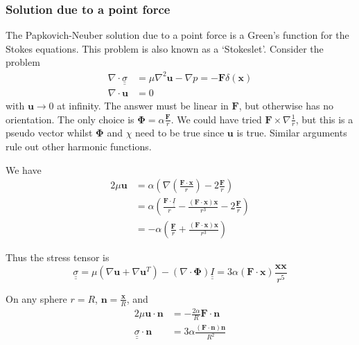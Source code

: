 \documentclass{jknotes}
\newcommand{\dunder}[1]{\underline{\underline{#1}}}
\newcommand{\x}{\bm{x}}
\newcommand{\inv}[1]{\frac{1}{#1}}
\begin{document}
\subsubsection{Solution due to a point force}
The Papkovich-Neuber solution due to a point force is a Green's function for
the Stokes equations. This problem is also known as a `Stokeslet'. Consider
the problem
\begin{equation}
	\begin{aligned}
		\nabla \cdot \dunder{\sigma} &= \mu \nabla^2 \bm{u} - \nabla p = -
		\bm{F} \delta(\x) \\
		\nabla \cdot \bm{u} &= 0
	\end{aligned}
\end{equation}
with $\bm{u} \to 0$ at infinity. The answer must be linear in $\bm{F}$, but
otherwise has no orientation. The only choice is $\bm{\Phi} = \alpha
\frac{\bm{F}}{r}$. We could have tried $\bm{F} \times \nabla \inv{r}$, but
this is a pseudo vector whilst $\bm{\Phi}$ and $\chi$ need to be true since
$\bm{u}$ is true. Similar arguments rule out other harmonic functions.

We have
\begin{equation}
	\begin{aligned}
		2\mu \bm{u} &= \alpha \left( \nabla \left( \frac{\bm{F} \cdot
			\x}{r}\right) - 2
		\frac{\bm{F}}{r}\right) \\
		&= \alpha \left( \frac{\bm{F} \cdot \dunder{I}}{r} -
	\frac{(\bm{F}\cdot\x)\x}{r^3} - 2\frac{\bm{F}}{r}\right) \\
	&= -\alpha \left( \frac{\bm{F}}{r} + \frac{(\bm{F}\cdot\x)\x}{r^3}\right)
\end{aligned}
\end{equation}

Thus the stress tensor is
\begin{equation}
	\dunder{\sigma} = \mu \left( \nabla \bm{u} + \nabla \bm{u}^T\right) -
	\left(\nabla \cdot \bm{\Phi}\right)\dunder{I} = 3\alpha (\bm{F} \cdot
	\bm{x}) \frac{\x \x}{r^5}
\end{equation}

On any sphere $r=R$, $\bm{n} = \frac{\x}{R}$, and
\begin{equation}
	\begin{aligned}
		2\mu \bm{u}\cdot\bm{n} &= -\frac{2\alpha}{R} \bm{F}\cdot\bm{n} \\
		\dunder{\sigma} \cdot \bm{n} &= 3 \alpha \frac{(\bm{F} \cdot
		\bm{n}) \bm{n}}{R^2}
	\end{aligned}
\end{equation}
\end{document}
